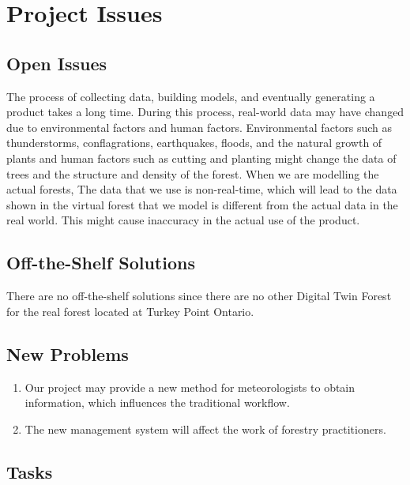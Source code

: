\documentclass{article}
\begin{document}
\newpage

\section{Project Issues}
\subsection{Open Issues}
The process of collecting data, building models, and eventually generating a product takes a long time. During this process, real-world data may have changed due to environmental factors and human factors. Environmental factors such as thunderstorms, conflagrations, earthquakes, floods, and the natural growth of plants and human factors such as cutting and planting might change the data of trees and the structure and density of the forest. When we are modelling the actual forests, The data that we use is non-real-time, which will lead to the data shown in the virtual forest that we model is different from the actual data in the real world. This might cause inaccuracy in the actual use of the product.
\subsection{Off-the-Shelf Solutions}
There are no off-the-shelf solutions since there are no other 
Digital Twin Forest for the real forest located at Turkey Point Ontario.

\subsection{New Problems}
\begin{enumerate}
    \item Our project may provide a new method for meteorologists to obtain information, which influences the traditional workflow. 
    \item The new management system will affect the work of forestry practitioners.
    
\end{enumerate}
\subsection{Tasks}
\end{document}
